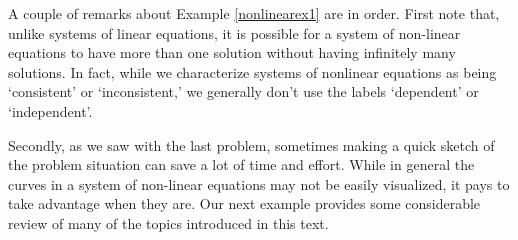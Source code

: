 \documentclass{ximera}
\begin{document}
A couple of remarks about Example \ref{nonlinearex1} are in order.  First note that, unlike systems of linear equations, it is possible for a system of non-linear equations to have more than one solution without having infinitely many solutions.  In fact, while we characterize systems of nonlinear equations as being `consistent' or `inconsistent,' we generally don't use the labels `dependent' or `independent'.  

Secondly, as we saw with the last problem, sometimes making a quick sketch of the problem situation can save a lot of time and effort.  While in general the curves in a system of non-linear equations may not be easily visualized, it pays to take advantage when they are.  Our next example provides some considerable review of many of the topics introduced in this text.
\end{document}
